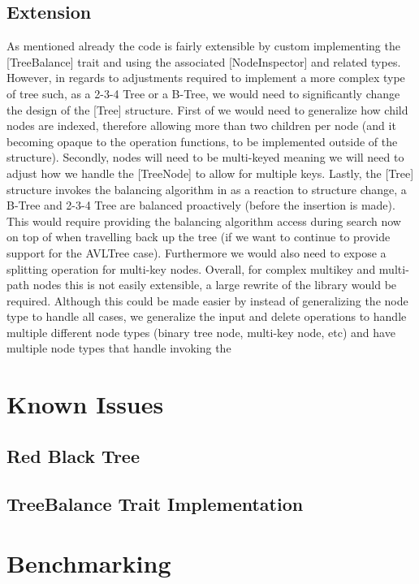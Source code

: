 \documentclass[12pt, letterpaper]{article}
\begin{document}
\subsection{Extension}
As mentioned already the code is fairly extensible by custom implementing the [TreeBalance] trait and using the associated
[NodeInspector] and related types.  However, in regards to adjustments required to implement a more complex type of tree such, as a 2-3-4 Tree or a B-Tree,
we would need to significantly change the design of the [Tree] structure.  First of we would need to generalize how child nodes are indexed, therefore allowing
more than two children per node (and it becoming opaque to the operation functions, to be implemented outside of the structure).
Secondly, nodes will need to be multi-keyed meaning we will need to adjust how we handle the [TreeNode] to allow for multiple keys.
Lastly, the [Tree] structure invokes the balancing algorithm in as a reaction to structure change, a B-Tree and 2-3-4 Tree are balanced
proactively (before the insertion is made).  This would require providing the balancing algorithm access during search now on top of when travelling back up the tree
(if we want to continue to provide support for the AVLTree case).  Furthermore we would also need to expose a splitting operation for multi-key nodes.
Overall, for complex multikey and multi-path nodes this is not easily extensible, a large rewrite of the library would be required.
Although this could be made easier by instead of generalizing the node type to handle all cases, we generalize the input and delete operations to handle
multiple different node types (binary tree node, multi-key node, etc) and have multiple node types that handle invoking the 

\section{Known Issues}

\subsection{Red Black Tree}

\subsection{TreeBalance Trait Implementation}

\section{Benchmarking}
\end{document}
